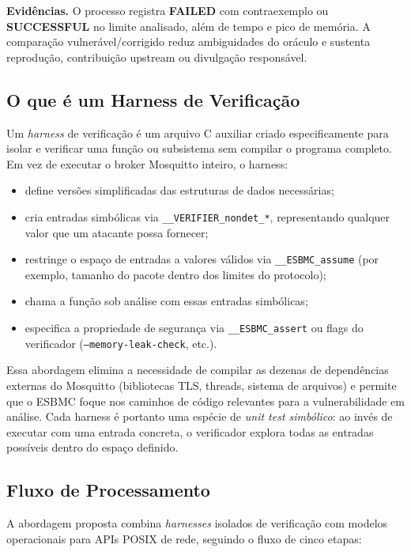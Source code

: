 \documentclass[conference]{IEEEtran}
\begin{document}
\textbf{Evid\^encias.} O processo registra \textbf{FAILED} com contraexemplo ou
\textbf{SUCCESSFUL} no limite analisado, al\'em de tempo e pico de mem\'oria. A
compara\c{c}\~ao vulner\'avel/corrigido reduz ambiguidades do or\'aculo e sustenta
reprodu\c{c}\~ao, contribui\c{c}\~ao upstream ou divulga\c{c}\~ao respons\'avel.

\subsection{O que \'{e} um Harness de Verifica\c{c}\~ao}
Um \emph{harness} de verifica\c{c}\~ao \'{e} um arquivo C auxiliar criado
especificamente para isolar e verificar uma fun\c{c}\~ao ou subsistema sem
compilar o programa completo. Em vez de executar o broker Mosquitto inteiro,
o harness:

\begin{itemize}
    \item define vers\~oes simplificadas das estruturas de dados necess\'arias;
    \item cria entradas simb\'olicas via \texttt{\_\_VERIFIER\_nondet\_*},
          representando qualquer valor que um atacante possa fornecer;
    \item restringe o espa\c{c}o de entradas a valores v\'alidos via
          \texttt{\_\_ESBMC\_assume} (por exemplo, tamanho do pacote dentro
          dos limites do protocolo);
    \item chama a fun\c{c}\~ao sob an\'alise com essas entradas simb\'olicas;
    \item especifica a propriedade de seguran\c{c}a via \texttt{\_\_ESBMC\_assert}
          ou flags do verificador (\texttt{--memory-leak-check}, etc.).
\end{itemize}

Essa abordagem elimina a necessidade de compilar as dezenas de depend\^encias
externas do Mosquitto (bibliotecas TLS, threads, sistema de arquivos) e permite
que o ESBMC foque nos caminhos de c\'odigo relevantes para a vulnerabilidade
em an\'alise. Cada harness \'{e} portanto uma esp\'ecie de \emph{unit test
simb\'olico}: ao inv\'es de executar com uma entrada concreta, o verificador
explora todas as entradas poss\'iveis dentro do espa\c{c}o definido.

\subsection{Fluxo de Processamento}
A abordagem proposta combina \emph{harnesses} isolados de verifica\c{c}\~ao com
modelos operacionais para APIs POSIX de rede, seguindo o fluxo de cinco etapas:
\end{document}
